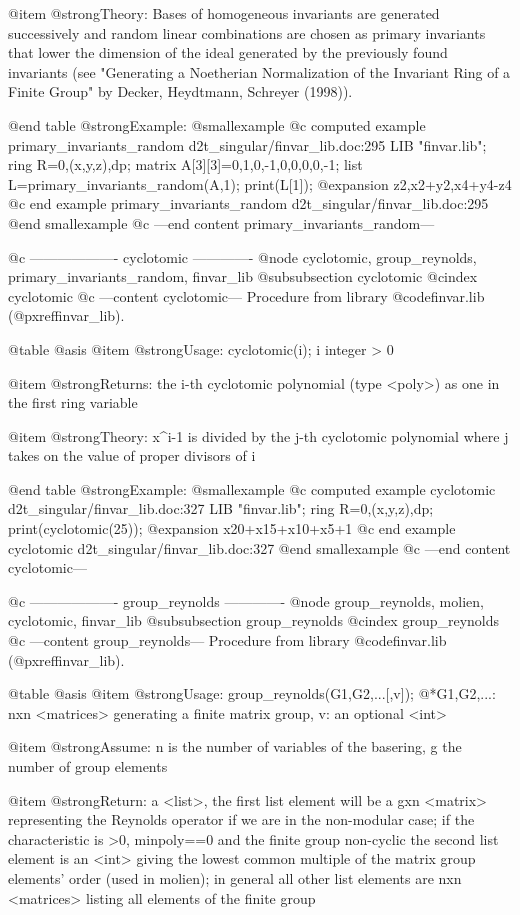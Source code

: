 @item @strong{Theory:}
Bases of homogeneous invariants are generated successively and random
linear combinations are chosen as primary invariants that lower the
dimension of the ideal generated by the previously found invariants
(see "Generating a Noetherian Normalization of the Invariant Ring of
a Finite Group" by Decker, Heydtmann, Schreyer (1998)).

@end table
@strong{Example:}
@smallexample
@c computed example primary_invariants_random d2t_singular/finvar_lib.doc:295 
LIB "finvar.lib";
ring R=0,(x,y,z),dp;
matrix A[3][3]=0,1,0,-1,0,0,0,0,-1;
list L=primary_invariants_random(A,1);
print(L[1]);
@expansion{} z2,x2+y2,x4+y4-z4
@c end example primary_invariants_random d2t_singular/finvar_lib.doc:295
@end smallexample
@c ---end content primary_invariants_random---

@c ------------------- cyclotomic -------------
@node cyclotomic, group_reynolds, primary_invariants_random, finvar_lib
@subsubsection cyclotomic
@cindex cyclotomic
@c ---content cyclotomic---
Procedure from library @code{finvar.lib} (@pxref{finvar_lib}).

@table @asis
@item @strong{Usage:}
cyclotomic(i); i integer > 0

@item @strong{Returns:}
the i-th cyclotomic polynomial (type <poly>) as one in the first ring
variable

@item @strong{Theory:}
x^i-1 is divided by the j-th cyclotomic polynomial where j takes on
the value of proper divisors of i

@end table
@strong{Example:}
@smallexample
@c computed example cyclotomic d2t_singular/finvar_lib.doc:327 
LIB "finvar.lib";
ring R=0,(x,y,z),dp;
print(cyclotomic(25));
@expansion{} x20+x15+x10+x5+1
@c end example cyclotomic d2t_singular/finvar_lib.doc:327
@end smallexample
@c ---end content cyclotomic---

@c ------------------- group_reynolds -------------
@node group_reynolds, molien, cyclotomic, finvar_lib
@subsubsection group_reynolds
@cindex group_reynolds
@c ---content group_reynolds---
Procedure from library @code{finvar.lib} (@pxref{finvar_lib}).

@table @asis
@item @strong{Usage:}
group_reynolds(G1,G2,...[,v]);
@*G1,G2,...: nxn <matrices> generating a finite matrix group, v: an
optional <int>

@item @strong{Assume:}
n is the number of variables of the basering, g the number of group
elements

@item @strong{Return:}
a <list>, the first list element will be a gxn <matrix> representing
the Reynolds operator if we are in the non-modular case; if the
characteristic is >0, minpoly==0 and the finite group non-cyclic the
second list element is an <int> giving the lowest common multiple of
the matrix group elements' order (used in molien); in general all
other list elements are nxn <matrices> listing all elements of the
finite group

